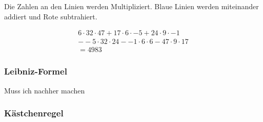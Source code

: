 \bigskip %

Die Zahlen an den Linien werden Multipliziert. Blaue Linien werden miteinander
addiert und Rote subtrahiert.

\begin{align*}
    6 \cdot 32 \cdot 47 + 17 \cdot 6 \cdot -5 + 24 \cdot 9 \cdot -1   \\
    - -5 \cdot 32 \cdot 24 - -1 \cdot 6 \cdot 6 - 47 \cdot 9 \cdot 17 \\
    = 4983
\end{align*}

\subsubsection*{Leibniz-Formel}

Muss ich nachher machen

\subsubsection*{Kästchenregel}


